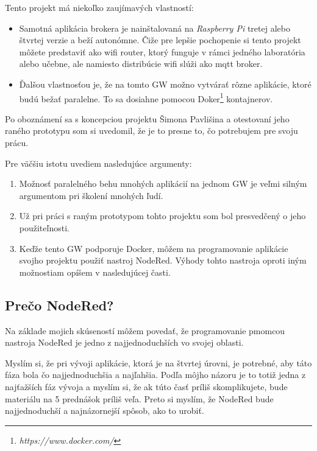 Tento projekt má niekoľko zaujímavých vlastností:
\begin{itemize}
    \item Samotná aplikácia brokera je nainštalovaná na \textit{Raspberry Pi} tretej alebo štvrtej verzie a beží autonómne. Čiže pre lepšie pochopenie si tento projekt môžete predstaviť ako wifi router, ktorý funguje v rámci jedného laboratória alebo učebne, ale namiesto distribúcie wifi slúži ako \gls{mqtt} broker.
    \item Ďalšou vlastnosťou je, že na tomto GW možno vytvárať rôzne aplikácie, ktoré budú bežať paralelne. To sa dosiahne pomocou Doker\footnote{\textit{https://www.docker.com/}} kontajnerov. 
\end{itemize}
Po oboznámení sa s koncepciou projektu Šimona Pavlišina a otestovaní jeho raného prototypu som si uvedomil, že je to presne to, čo potrebujem pre svoju prácu. 

Pre väčšiu istotu uvediem nasledujúce argumenty:
\begin{enumerate}
    \item Možnosť paralelného behu mnohých aplikácií na jednom GW je veľmi silným argumentom pri školení mnohých ľudí.
    \item Už pri práci s raným prototypom tohto projektu som bol presvedčený o jeho použiteľnosti.
    \item Keďže tento GW podporuje Docker, môžem na programovanie aplikácie svojho projektu použiť nastroj NodeRed. Výhody tohto nastroja oproti iným možnostiam opíšem v nasledujúcej časti.
\end{enumerate}
\subsection{Prečo NodeRed?}
Na základe mojich skúseností môžem povedať, že programovanie pmomcou nastroja NodeRed je jedno z najjednoduchších vo svojej oblasti. 

Myslím si, že pri vývoji aplikácie, ktorá je na štvrtej úrovni, je potrebné, aby táto fáza bola čo najjednoduchšia a najľahšia. Podľa môjho názoru je to totiž jedna z najťažších fáz vývoja a myslím si, že ak túto časť príliš skomplikujete, bude materiálu na 5 prednášok príliš veľa. Preto si myslím, že NodeRed bude najjednoduchší a najnázornejší spôsob, ako to urobiť.
